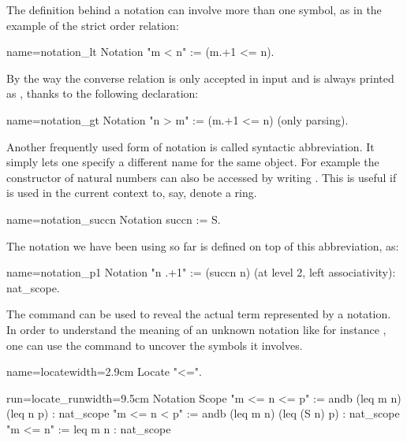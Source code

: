 The definition behind a notation can involve more than one symbol,
as in the example of the strict order relation:


\begin{coq}{name=notation_lt}{}
Notation "m < n"  := (m.+1 <= n).
\end{coq}


By the way the converse relation  is only accepted in input
and is always printed as  , thanks to the following declaration:

\begin{coq}{name=notation_gt}{}
Notation "n > m"  := (m.+1 <= n) (only parsing).
\end{coq}

Another frequently used form of notation is called syntactic abbreviation.
It simply lets one specify a different name for the same object.
For example the  constructor of natural numbers can also be accessed
by writing .  This is useful if  is used in the current context
to, say, denote a ring.

\begin{coq}{name=notation_succn}{}
Notation succn := S.
\end{coq}

The notation  we have been using so far is defined on top of
this abbreviation, as:

\begin{coq}{name=notation_p1}{}
Notation "n .+1" := (succn n) (at level 2, left associativity): nat_scope.
\end{coq}


The  command can be used to reveal the actual term
represented by a notation.  In order to understand the meaning of an unknown notation like for instance , one can use the  command to uncover the symbols it involves.

\begin{coq}{name=locate}{width=2.9cm}
Locate "<=".
$~$
$~$
$~$
\end{coq}
\begin{coqout}{run=locate_run}{width=9.5cm}
Notation                                       Scope
"m <= n <= p" := andb (leq m n) (leq n p)    : nat_scope
"m <= n < p" := andb (leq m n) (leq (S n) p) : nat_scope
"m <= n" := leq m n                          : nat_scope
\end{coqout}

